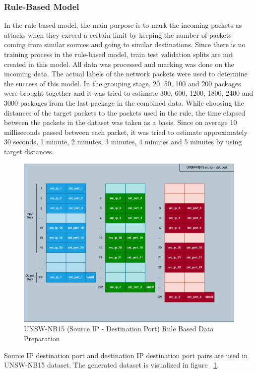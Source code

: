 \documentclass{article}
\begin{document}
\subsubsection{Rule-Based Model}

In the rule-based model, the main purpose is to mark the incoming packets as attacks when they exceed a certain limit by keeping the number of packets coming from similar sources and going to similar destinations. Since there is no training process in the rule-based model, train test validation splits are not created in this model. All data was processed and marking was done on the incoming data. The actual labels of the network packets were used to determine the success of this model. In the grouping stage, 20, 50, 100 and 200 packages were brought together and it was tried to estimate 300, 600, 1200, 1800, 2400 and 3000 packages from the last package in the combined data. While choosing the distances of the target packets to the packets used in the rule, the time elapsed between the packets in the dataset was taken as a basis. Since on average 10 milliseconds passed between each packet, it was tried to estimate approximately 30 seconds, 1 minute, 2 minutes, 3 minutes, 4 minutes and 5 minutes by using target distances.

\begin{figure}
  \centering
  \includegraphics[width=\textwidth]{unswnb15_rule_based.png}
  \caption{UNSW-NB15 (Source IP - Destination Port) Rule Based Data Preparation}
  \label{unswnb15-rule-based}
\end{figure}

Source IP destination port and destination IP destination port pairs are used in UNSW-NB15 dataset. The generated dataset is visualized in figure ~\ref{unswnb15-rule-based}.
\end{document}
